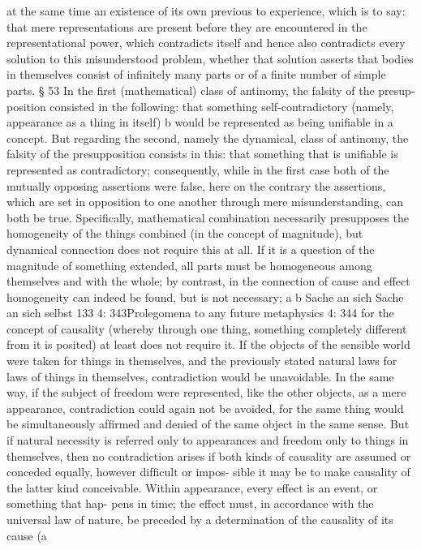 at the same time an existence of its own previous to experience, which is to
say: that mere representations are present before they are encountered
in the representational power, which contradicts itself and hence also
contradicts every solution to this misunderstood problem, whether that
solution asserts that bodies in themselves consist of inﬁnitely many parts
or of a ﬁnite number of simple parts.
§ 53
In the ﬁrst (mathematical) class of antinomy, the falsity of the presup-
position consisted in the following: that something self-contradictory
(namely, appearance as a thing in itself) b would be represented as being
uniﬁable in a concept. But regarding the second, namely the dynamical,
class of antinomy, the falsity of the presupposition consists in this: that
something that is uniﬁable is represented as contradictory; consequently,
while in the ﬁrst case both of the mutually opposing assertions were false,
here on the contrary the assertions, which are set in opposition to one
another through mere misunderstanding, can both be true.
Speciﬁcally, mathematical combination necessarily presupposes the
homogeneity of the things combined (in the concept of magnitude), but
dynamical connection does not require this at all. If it is a question of
the magnitude of something extended, all parts must be homogeneous
among themselves and with the whole; by contrast, in the connection of
cause and effect homogeneity can indeed be found, but is not necessary;
a
b
Sache an sich
Sache an sich selbst
133
4: 343Prolegomena to any future metaphysics
4: 344
for the concept of causality (whereby through one thing, something
completely different from it is posited) at least does not require it.
If the objects of the sensible world were taken for things in themselves,
and the previously stated natural laws for laws of things in themselves,
contradiction would be unavoidable. In the same way, if the subject of
freedom were represented, like the other objects, as a mere appearance,
contradiction could again not be avoided, for the same thing would be
simultaneously afﬁrmed and denied of the same object in the same sense.
But if natural necessity is referred only to appearances and freedom only
to things in themselves, then no contradiction arises if both kinds of
causality are assumed or conceded equally, however difﬁcult or impos-
sible it may be to make causality of the latter kind conceivable.
Within appearance, every effect is an event, or something that hap-
pens in time; the effect must, in accordance with the universal law of
nature, be preceded by a determination of the causality of its cause (a
